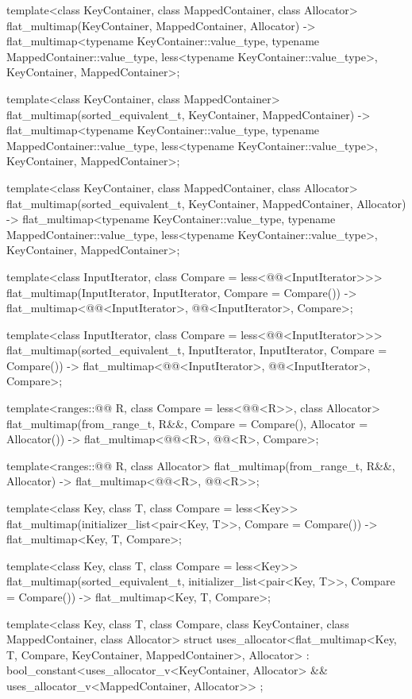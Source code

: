 \begin{codeblock}
{  template<class KeyContainer, class MappedContainer, class Allocator>
    flat_multimap(KeyContainer, MappedContainer, Allocator)
      -> flat_multimap<typename KeyContainer::value_type, typename MappedContainer::value_type,
                       less<typename KeyContainer::value_type>, KeyContainer, MappedContainer>;

  template<class KeyContainer, class MappedContainer>
    flat_multimap(sorted_equivalent_t, KeyContainer, MappedContainer)
      -> flat_multimap<typename KeyContainer::value_type, typename MappedContainer::value_type,
                       less<typename KeyContainer::value_type>, KeyContainer, MappedContainer>;

  template<class KeyContainer, class MappedContainer, class Allocator>
    flat_multimap(sorted_equivalent_t, KeyContainer, MappedContainer, Allocator)
      -> flat_multimap<typename KeyContainer::value_type, typename MappedContainer::value_type,
                       less<typename KeyContainer::value_type>, KeyContainer, MappedContainer>;

  template<class InputIterator, class Compare = less<@@<InputIterator>>>
    flat_multimap(InputIterator, InputIterator, Compare = Compare())
      -> flat_multimap<@@<InputIterator>, @@<InputIterator>, Compare>;

  template<class InputIterator, class Compare = less<@@<InputIterator>>>
    flat_multimap(sorted_equivalent_t, InputIterator, InputIterator, Compare = Compare())
      -> flat_multimap<@@<InputIterator>, @@<InputIterator>, Compare>;

  template<ranges::@@ R, class Compare = less<@@<R>>,
           class Allocator>
    flat_multimap(from_range_t, R&&, Compare = Compare(), Allocator = Allocator())
      -> flat_multimap<@@<R>, @@<R>, Compare>;

  template<ranges::@@ R, class Allocator>
    flat_multimap(from_range_t, R&&, Allocator)
      -> flat_multimap<@@<R>, @@<R>>;

  template<class Key, class T, class Compare = less<Key>>
    flat_multimap(initializer_list<pair<Key, T>>, Compare = Compare())
      -> flat_multimap<Key, T, Compare>;

  template<class Key, class T, class Compare = less<Key>>
    flat_multimap(sorted_equivalent_t, initializer_list<pair<Key, T>>, Compare = Compare())
        -> flat_multimap<Key, T, Compare>;

  template<class Key, class T, class Compare, class KeyContainer, class MappedContainer,
            class Allocator>
    struct uses_allocator<flat_multimap<Key, T, Compare, KeyContainer, MappedContainer>,
                          Allocator>
      : bool_constant<uses_allocator_v<KeyContainer, Allocator> &&
                      uses_allocator_v<MappedContainer, Allocator>> { };
}
\end{codeblock}


